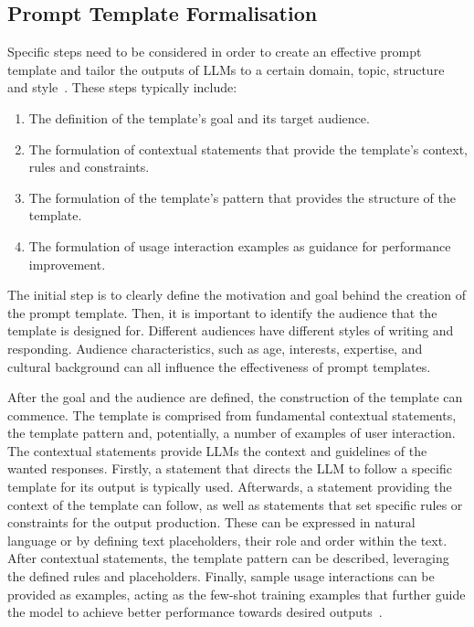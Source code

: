 \documentclass[sn-mathphys-num]{sn-jnl}%
\begin{document}
\subsection{Prompt Template Formalisation}\label{sec:promptTemplate}
Specific steps need to be considered in order to create an effective prompt template and tailor the outputs of LLMs to a certain domain, topic, structure and style~\cite{wang2023prompt,white2023prompt,lai2023chatgpt}.
These steps typically include: 
\begin{enumerate}
    \item The definition of the template's goal and its target audience.
    \item The formulation of contextual statements that provide the template's context, rules and constraints.
    \item The formulation of the template's pattern that provides the structure of the template.
    \item The formulation of usage interaction examples as guidance for performance improvement.

\end{enumerate}


The initial step is to clearly define the motivation and goal behind the creation of the prompt template. Then, it is important to identify the audience that the template is designed for. Different audiences have different styles of writing and responding. Audience characteristics, such as age, interests, expertise, and cultural background can all influence the effectiveness of prompt templates. 

After the goal and the audience are defined, the construction of the template can commence. The template is comprised from fundamental contextual statements, the template pattern and, potentially, a number of examples of user interaction. The contextual statements provide LLMs the context and guidelines of the wanted responses. Firstly, a statement that directs the LLM to follow a specific template for its output is typically used. Afterwards, a statement providing the context of the template can follow, as well as statements that set specific rules or constraints for the output production. These can be expressed in natural language or by defining text placeholders, their role and order within the text. After contextual statements, the template pattern can be described, leveraging the defined rules and placeholders. Finally, sample usage interactions can be provided as examples, acting as the few-shot training examples that further guide the model to achieve better performance towards desired outputs~\cite{wang2023prompt,lai2023chatgpt}.
\end{document}
